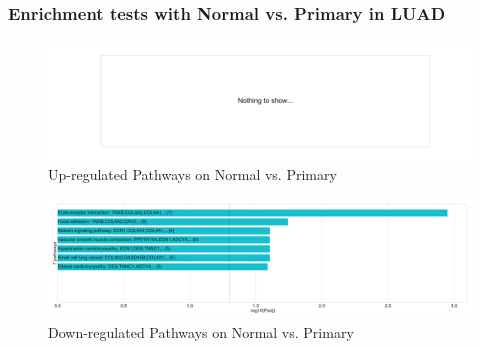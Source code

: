 \documentclass{beamer}
\begin{document}
    \begin{frame}
        \frametitle{Enrichment tests with Normal vs. Primary in LUAD}

        \begin{figure}
            \includegraphics[width=0.8 \linewidth]{figures/DEG/Enrichment/STAR.FPKM.ADC.Normal-Primary.Up.KEGG.pdf}
            \caption{Up-regulated Pathways on Normal vs. Primary}
        \end{figure}

        \begin{figure}
            \includegraphics[width=0.8 \linewidth]{figures/DEG/Enrichment/STAR.FPKM.ADC.Normal-Primary.Down.KEGG.pdf}
            \caption{Down-regulated Pathways on Normal vs. Primary}
        \end{figure}
    \end{frame}
\end{document}
